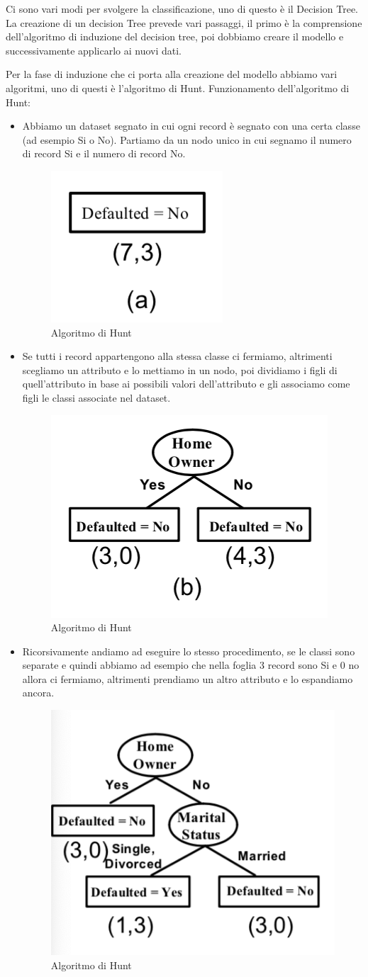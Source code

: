 \documentclass[14pt]{extreport}
\begin{document}
Ci sono vari modi per svolgere la classificazione, uno di questo è il Decision Tree.
La creazione di un decision Tree prevede vari passaggi, il primo è la comprensione dell'algoritmo di induzione del decision tree, poi dobbiamo creare il modello e successivamente applicarlo ai nuovi dati.

Per la fase di induzione che ci porta alla creazione del modello abbiamo vari algoritmi, uno di questi è l'algoritmo di Hunt.
Funzionamento dell'algoritmo di Hunt:
\begin{itemize}
    \item Abbiamo un dataset segnato in cui ogni record è segnato con una certa classe (ad esempio Si o No). Partiamo da un nodo unico in cui segnamo il numero di record Si e il numero di record No.
    \begin{figure}[h!]
  \includegraphics[width=0.3\linewidth]{Hunt1.png}
  \caption{Algoritmo di Hunt}
\end{figure}
    \item Se tutti i record appartengono alla stessa classe ci fermiamo, altrimenti scegliamo un attributo e lo mettiamo in un nodo, poi dividiamo i figli di quell'attributo in base ai possibili valori dell'attributo e gli associamo come figli le classi associate nel dataset.
    \begin{figure}[h!]
  \includegraphics[width=0.3\linewidth]{Hunt2.png}
  \caption{Algoritmo di Hunt}
\end{figure}
    \item Ricorsivamente andiamo ad eseguire lo stesso procedimento, se le classi sono separate e quindi abbiamo ad esempio che nella foglia 3 record sono Si e 0 no allora ci fermiamo, altrimenti prendiamo un altro attributo e lo espandiamo ancora.
    \begin{figure}[h!]
  \includegraphics[width=0.3\linewidth]{Hunt3.png}
  \caption{Algoritmo di Hunt}
\end{figure}
\end{itemize}
\end{document}
